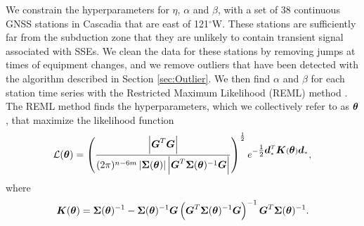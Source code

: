 \documentclass[extra,mreferee]{gji}
\begin{document}
We constrain the hyperparameters for $\eta$, $\alpha$ and $\beta$, with a set of 38 continuous GNSS stations in Cascadia that are east of 121$^\circ$W.  These stations are sufficiently far from the subduction zone that they are unlikely to contain transient signal associated with SSEs.  We clean the data for these stations by removing jumps at times of equipment changes, and we remove outliers that have been detected with the algorithm described in Section \ref{sec:Outlier}. We then find $\alpha$ and $\beta$ for each station time series with the Restricted Maximum Likelihood (REML) method \cite[e.g.,][]{Harville1974,Cressie1992,Hines2017}. The REML method finds the hyperparameters, which we collectively refer to as $\mitbf{\theta}$, that maximize the likelihood function
\begin{equation}\label{eq:REML}
\mathcal{L}(\mitbf{\theta}) = \left(\frac{\left|\mitbf{G}^T\mitbf{G}\right|}
                           {(2\pi)^{n-6m} 
                           \left| \mitbf{\Sigma}(\mitbf{\theta}) \right| 
                           \left| \mitbf{G}^T\mitbf{\Sigma}(\mitbf{\theta})^{-1}\mitbf{G} \right|}\right)^{\frac{1}{2}} 
                           e^{-\tfrac{1}{2}\mitbf{d}_*^T\mitbf{K}(\mitbf{\theta})\mitbf{d}_*},
\end{equation}
where
\begin{equation}
\mitbf{K}(\mitbf{\theta}) = \mitbf{\Sigma}(\mitbf{\theta})^{-1} - 
                      \mitbf{\Sigma}(\mitbf{\theta})^{-1}\mitbf{G}
         \left(\mitbf{G}^T\mitbf{\Sigma}(\mitbf{\theta})^{-1}\mitbf{G}\right)^{-1}
         \mitbf{G}^T\mitbf{\Sigma}(\mitbf{\theta})^{-1}.
\end{equation}
\end{document}
